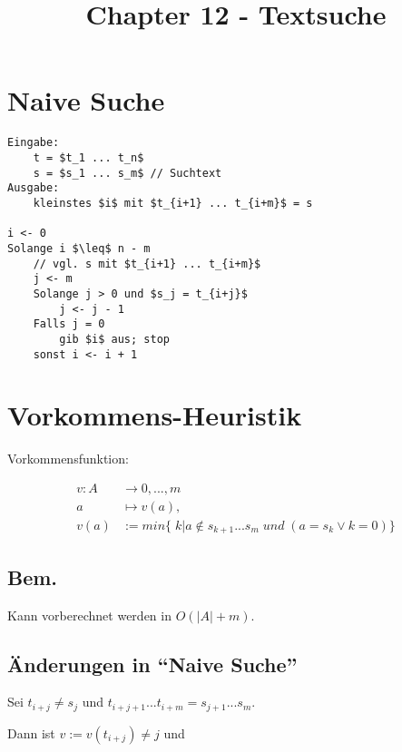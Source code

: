 \documentclass[8pt, DIV15, twocolumn]{scrartcl}
\title{Chapter 12 - Textsuche}
\date{}
\begin{document}
\setlength{\abovedisplayskip}{0pt}
\setlength{\belowdisplayskip}{0pt}
\setlength{\parskip}{0pt}
\setlength{\topmargin}{0pt}

 
\maketitle

\thispagestyle{empty}


\section*{Naive Suche}

\begin{lstlisting}[mathescape=true]
Eingabe:
	t = $t_1 ... t_n$
	s = $s_1 ... s_m$ // Suchtext
Ausgabe:
	kleinstes $i$ mit $t_{i+1} ... t_{i+m}$ = s

i <- 0
Solange i $\leq$ n - m
	// vgl. s mit $t_{i+1} ... t_{i+m}$
	j <- m
	Solange j > 0 und $s_j = t_{i+j}$
		j <- j - 1
	Falls j = 0
		gib $i$ aus; stop
	sonst i <- i + 1 
\end{lstlisting}

\section*{Vorkommens-Heuristik}

Vorkommensfunktion:

\begin{equation*}
\begin{aligned}
	v : A &\rightarrow {0, ..., m} \\
		a &\mapsto v(a), \\
	v(a) &:= min \{\;k| a \not \in s_{k+1} ... s_m \;und\; \left( a = s_k \vee k = 0 \right) \}
\end{aligned}
\end{equation*}

\subsection*{Bem.}
Kann vorberechnet werden in $O(|A| + m)$.

\subsection*{Änderungen in "`Naive Suche"'}
Sei $t_{i+j} \neq s_j$ und $t_{i+j+1} ... t_{i+m} = s_{j+1} ... s_m$.

Dann ist $v := v(t_{i+j}) \neq j$ und
\end{document}
